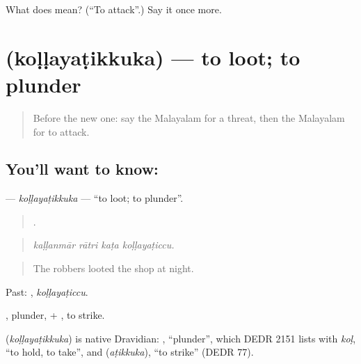 \begin{tcolorbox}[breakable,colback=teal!4,colframe=teal!35!black,title={Before you move on}]
What does  mean? (\textquotedblleft{}To attack\textquotedblright{}.) Say it once more.
\end{tcolorbox}
\section[\texorpdfstring{\ml{കൊള്ളയടിക്കുക} (koḷḷayaṭikkuka)}{കൊള്ളയടിക്കുക (koḷḷayaṭikkuka)}]{ (koḷḷayaṭikkuka) — to loot; to plunder}

\label{lesson:ML-C373-kollayatikkuka}



\begin{quote}
Before the new one: say the Malayalam for a threat, then the Malayalam for to attack.
\end{quote}

\subsection*{You'll want to know: }
\textbf{} — \emph{koḷḷayaṭikkuka} — \textquotedblleft{}to loot; to plunder\textquotedblright{}.

\begin{quote}
   .
\end{quote}

\begin{quote}
\emph{kaḷḷanmār rātri kaṭa koḷḷayaṭiccu.}
\end{quote}

\begin{quote}
The robbers looted the shop at night.
\end{quote}

Past: , \emph{koḷḷayaṭiccu}.

, plunder, + , to strike.

\begin{cousinweb}
\textbf{} (\emph{koḷḷayaṭikkuka}) is native Dravidian: , \textquotedblleft{}plunder\textquotedblright{}, which DEDR 2151 lists with \emph{koḷ}, \textquotedblleft{}to hold, to take\textquotedblright{}, and  (\emph{aṭikkuka}), \textquotedblleft{}to strike\textquotedblright{} (DEDR 77).
\end{cousinweb}

